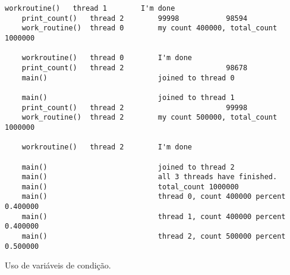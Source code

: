 \begin{parts}
\begin{solution}
\begin{Verbatim}[label={\$ sudo ./prog1 p}, fontsize=\small]
    workroutine()   thread 1        I'm done
    print_count()   thread 2        99998           98594
    work_routine()  thread 0        my count 400000, total_count 1000000
    
    workroutine()   thread 0        I'm done
    print_count()   thread 2                        98678
    main()                          joined to thread 0 
    
    main()                          joined to thread 1 
    print_count()   thread 2                        99998
    work_routine()  thread 2        my count 500000, total_count 1000000
    
    workroutine()   thread 2        I'm done
    
    main()                          joined to thread 2 
    main()                          all 3 threads have finished. 
    main()                          total_count 1000000
    main()                          thread 0, count 400000 percent 0.400000
    main()                          thread 1, count 400000 percent 0.400000
    main()                          thread 2, count 500000 percent 0.500000  
    \end{Verbatim}
  \end{solution} 
\end{parts}

\question
Uso de variáveis de condição.

